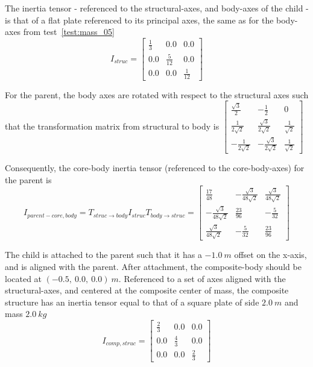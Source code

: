 \begin{description}
The inertia tensor - referenced to the structural-axes, and body-axes of the 
child - is that of a flat plate referenced to its principal axes, the same as 
for the body-axes from test~\ref{test:mass_05}
\begin{equation*}
I_{struc} = 
   \begin{bmatrix} \frac{1}{3} & 0.0   & 0.0  \\
                   0.0   & \frac{5}{12} & 0.0   \\
                    0.0  & 0.0   & \frac{1}{12} 
   \end{bmatrix}
\end{equation*}

For the parent, the body axes are rotated with respect to the structural axes 
such that the transformation matrix from structural to body is
$
   \begin{bmatrix} \frac{\sqrt{3}}{2} & -\frac{1}{2}   & 0  \\
                   \frac{1}{2\sqrt{2}}   & \frac{\sqrt{3}}{2\sqrt{2}} & 
                   \frac{1}{\sqrt{2}}   \\
                   -\frac{1}{2\sqrt{2}}   & -\frac{\sqrt{3}}{2\sqrt{2}} & 
                   \frac{1}{\sqrt{2}} 
   \end{bmatrix}
$

Consequently, the core-body inertia tensor (referenced to the core-body-axes) 
for the parent is
 \begin{equation}
I_{parent-core, body} = T_{struc \rightarrow body} I_{struc} T_{body 
\rightarrow struc} = 
 \begin{bmatrix} 
 \frac{17}{48} & -\frac{\sqrt{3}}{48\sqrt{2}} & \frac{\sqrt{3}}{48\sqrt{2}}  \\
 -\frac{\sqrt{3}}{48\sqrt{2}} & \frac{23}{96} & -\frac{5}{32}   \\
 \frac{\sqrt{3}}{48\sqrt{2}} & -\frac{5}{32} & \frac{23}{96} 
   \end{bmatrix}
\label{eq:body_rotation}
\end{equation}

The child is attached to the parent such that it has a $-1.0~m$ offset on the 
x-axis, and is aligned with the parent.  After attachment, the composite-body 
should be located at $(-0.5,~0.0,~0.0)~m$.  Referenced to a set of axes 
aligned with the structural-axes, and centered at the composite center of 
mass, the composite structure has an inertia tensor equal to that of a square 
plate of side $2.0~m$ and mass $2.0~kg$
\begin{equation*}
  I_{comp,struc} = 
   \begin{bmatrix} \frac{2}{3} & 0.0   & 0.0  \\
                   0.0   & \frac{4}{3} & 0.0   \\
                    0.0  & 0.0   & \frac{2}{3} 
   \end{bmatrix}
\end{equation*}


\end{description}
